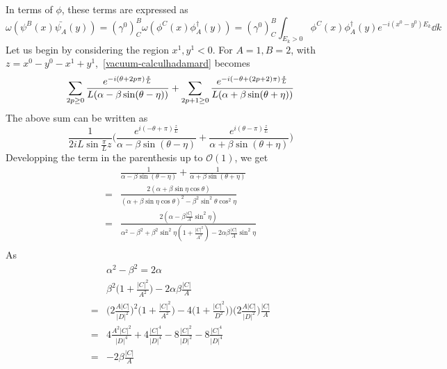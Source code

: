 In terms of $\phi$, these terms are expressed as
\begin{equation}\label{vacuum-calculhadamard}
\omega(\psi^B(x) \bar{\psi_A}(y)) = 
(\gamma^0)^B_C \omega(\phi^C(x) \phi^\dagger_A(y)) = (\gamma^0)^B_C
\int_{E_k > 0} \phi^C(x) \phi^\dagger_A(y) e^{-i(x^0 - y^0) E_k} \dd k
\end{equation}
Let us begin by considering the region $x^1, y^1 < 0$. 
For $A =1, B= 2$, with $z =x^0 - y^0 - x^1 +y^1$,~\cref{vacuum-calculhadamard} becomes
\begin{equation}
\sum_{2p \geq 0} \frac{e^{-i(\theta + 2p\pi)\frac{z}{L}}}{L(\alpha - \beta \sin (\theta - \eta))} 
+ \sum_{2p+1 \geq 0} \frac{e^{-i(- \theta + (2p+2)\pi)\frac{z}{L}}}{L(\alpha + \beta \sin (\theta + \eta))}\\
\end{equation}
The above sum can be written as
\begin{equation}
\frac{1}{2i L\sin\frac{\pi}{L}z} \bigg( \frac{e^{i(-\theta + \pi)\frac{z}{L}}}{\alpha - \beta \sin (\theta - \eta)}
+ \frac{e^{i(\theta - \pi) \frac{z}{L}}}{\alpha + \beta \sin (\theta + \eta)}
\bigg)
\end{equation}
Developping the term in the parenthesis up to $\mathcal{O}(1)$, we get
\begin{equation}
\begin{split}
& \frac{1}{\alpha - \beta \sin (\theta - \eta)}
   + \frac{1}{\alpha + \beta \sin (\theta + \eta)} \\
= & \frac{2(\alpha + \beta \sin \eta \cos \theta)}{(\alpha + \beta \sin \eta \cos \theta)^2 - \beta^2 \sin^2 \theta \cos^2 \eta} \\
= & \frac{2(\alpha - \beta \frac{|C|}{A} \sin^2 \eta)}{\alpha^2 - \beta^2 + \beta^2 \sin^2 \eta (1 + \frac{|C|^2}{A^2}) - 2 \alpha \beta \frac{|C|}{A} \sin^2 \eta} \\
\end{split}
\end{equation}
As
\begin{equation*}
\begin{split}
& \alpha^2 - \beta ^ 2 = 2 \alpha \\
&  \beta^2 \big(1 + \frac{|C|^2}{A^2} \big) - 2 \alpha \beta \frac{|C|}{A} \\
= & \big(2\frac{A |C|}{|D|^2} \big)^2 \big( 1+ \frac{|C|^2}{A^2} \big) - 4\big( 1+ \frac{|C|^2}{D^2}))\big(2\frac{A |C|}{|D|^2} \big) \frac{|C|}{A}  \\
= & 4 \frac{A^2 |C|^2}{|D|^4} + 4\frac{|C|^4}{|D|^4} - 8\frac{|C|^2}{|D|^2} - 8\frac{|C|^4}{|D|^4} \\
= & -2 \beta \frac{|C|}{A}
\end{split}
\end{equation*}
